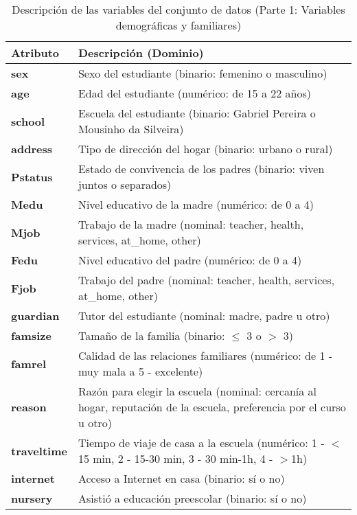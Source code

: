 \begin{table}[htbp]
\centering
\caption{Descripción de las variables del conjunto de datos (Parte 1: Variables demográficas y familiares)}
\begin{tabular}{lp{8cm}}
\hline
\textbf{Atributo} & \textbf{Descripción (Dominio)} \\
\hline
\textbf{sex} & Sexo del estudiante (binario: femenino o masculino) \\
\textbf{age} & Edad del estudiante (numérico: de 15 a 22 años) \\
\textbf{school} & Escuela del estudiante (binario: Gabriel Pereira o Mousinho da Silveira) \\
\textbf{address} & Tipo de dirección del hogar (binario: urbano o rural) \\
\textbf{Pstatus} & Estado de convivencia de los padres (binario: viven juntos o separados) \\
\textbf{Medu} & Nivel educativo de la madre (numérico: de 0 a 4) \\
\textbf{Mjob} & Trabajo de la madre (nominal: teacher, health, services, at\_home, other) \\
\textbf{Fedu} & Nivel educativo del padre (numérico: de 0 a 4) \\
\textbf{Fjob} & Trabajo del padre (nominal: teacher, health, services, at\_home, other) \\
\textbf{guardian} & Tutor del estudiante (nominal: madre, padre u otro) \\
\textbf{famsize} & Tamaño de la familia (binario: $\leq$ 3 o $>$ 3) \\
\textbf{famrel} & Calidad de las relaciones familiares (numérico: de 1 - muy mala a 5 - excelente) \\
\textbf{reason} & Razón para elegir la escuela (nominal: cercanía al hogar, reputación de la escuela, preferencia por el curso u otro) \\
\textbf{traveltime} & Tiempo de viaje de casa a la escuela (numérico: 1 - $<$15 min, 2 - 15-30 min, 3 - 30 min-1h, 4 - $>$1h) \\
\textbf{internet} & Acceso a Internet en casa (binario: sí o no) \\
\textbf{nursery} & Asistió a educación preescolar (binario: sí o no) \\
\hline
\end{tabular}
\label{tab:variables_parte1}
\end{table}

